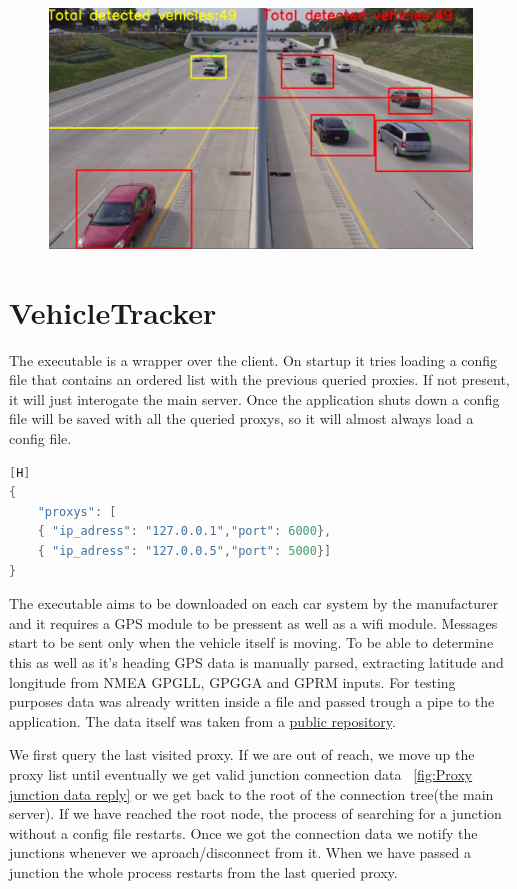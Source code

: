 \documentclass[17pt]{report}
\begin{document}
\begin{figure}[h!]
    \includegraphics[width=\textwidth]{TrafficDetectionRunningExample2.png}

    \label{fig:Running client samples}
\end{figure}

\pagebreak
\section{VehicleTracker}
\indent \indent
The executable is a wrapper over the client. On startup it tries loading a
config file that contains an ordered list with the previous queried proxies.
If not present, it will just interogate the main server. Once the application
shuts down a config file will be saved with all the queried proxys, so it will
almost always load a config file.

\begin{lstlisting}[language = C++][H]
{
    "proxys": [
    { "ip_adress": "127.0.0.1","port": 6000},
    { "ip_adress": "127.0.0.5","port": 5000}]
}
\end{lstlisting}

The executable aims to be downloaded on each car system by the manufacturer
and it requires a GPS module to be pressent as well as a wifi module. Messages
start to be sent only when the vehicle itself is moving. To be able to
determine this as well as it's heading GPS data is manually parsed, extracting
latitude and longitude from NMEA GPGLL, GPGGA and GPRM inputs. For testing
purposes data was already written inside a file and passed trough a pipe to the
application. The data itself was taken from a \href{https://github.com/ChrisvdHoorn/NMEA_message_GPS_data}{public repository}.

\indent \indent
We first query the last visited proxy. If we are out of reach, we move up the proxy list
until eventually we get valid junction connection data ~\ref{fig:Proxy junction data reply} or we get back to
the root of the connection tree(the main server). If we have reached the root node, 
the process of searching for a junction without a config file restarts. Once we got the 
connection data we notify the junctions whenever we aproach/disconnect from it. When we 
have passed a junction the whole process restarts from the last queried proxy.
\end{document}

